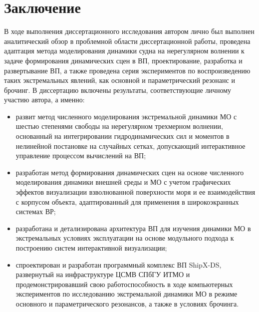 \chapter*{Заключение}


В ходе выполнения диссертационного исследования автором лично был выполнен аналитический обзор в проблемной области диссертационной работы, проведена адаптация метода моделирования динамики судна на нерегулярном волнении к задаче формирования динамических сцен в ВП, проектирование, разработка и развертывание ВП, а также проведена серия экспериментов по воспроизведению таких экстремальных явлений, как основной и параметрический резонанс и брочинг. В диссертацию включены результаты, соответствующие личному участию автора, а именно:

\begin{itemize}

\item	развит метод численного моделирования экстремальной динамики МО с шестью степенями свободы на нерегулярном трехмерном волнении, основанный на интегрировании гидродинамических сил и моментов в нелинейной постановке на случайных сетках, допускающий интерактивное управление процессом вычислений на ВП;
\item	разработан метод формирования динамических сцен на основе численного моделирования динамики внешней среды и МО с учетом графических эффектов визуализации взволнованной поверхности моря и ее взаимодействия с корпусом объекта, адаптированный для применения в широкоэкранных системах ВР;
\item	разработана и детализирована архитектура ВП для изучения динамики МО в экстремальных условиях эксплуатации на основе модульного подхода к построению систем интерактивной визуализации;
\item		спроектирован и разработан программный комплекс ВП ShipX-DS, развернутый на инфраструктуре ЦСМВ СПбГУ ИТМО и продемонстрировавший свою работоспособность в ходе компьютерных экспериментов по исследованию экстремальной динамики МО в режиме основного и параметрического резонансов, а также в условиях брочинга.



\end{itemize}
